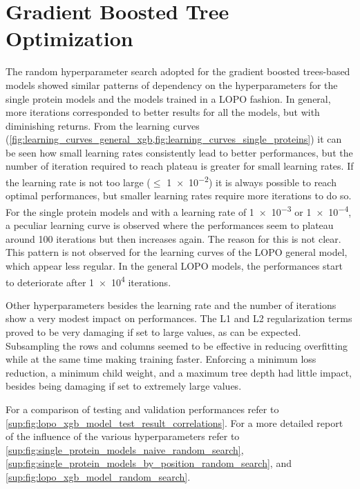 \section{Gradient Boosted Tree Optimization}
The random hyperparameter search adopted for the gradient boosted trees-based models showed similar patterns of dependency on the hyperparameters for the single protein models and the models trained in a LOPO fashion.
In general, more iterations corresponded to better results for all the models, but with diminishing returns.
From the learning curves (\cref{fig:learning_curves_general_xgb,fig:learning_curves_single_proteins}) it can be seen how small learning rates consistently lead to better performances, but the number of iteration required to reach plateau is greater for small learning rates.
If the learning rate is not too large ($\leq$ \num{1e-2}) it is always possible to reach optimal performances, but smaller learning rates require more iterations to do so.
For the single protein models and with a learning rate of \num{1e-3} or \num{1e-4}, a peculiar learning curve is observed where the performances seem to plateau around \num{100} iterations but then increases again.
The reason for this is not clear.
This pattern is not observed for the learning curves of the LOPO general model, which appear less regular.
In the general LOPO models, the performances start to deteriorate after \num{1e4} iterations.

Other hyperparameters besides the learning rate and the number of iterations show a very modest impact on performances.
The L1 and L2 regularization terms proved to be very damaging if set to large values, as can be expected.
Subsampling the rows and columns seemed to be effective in reducing overfitting while at the same time making training faster.
Enforcing a minimum loss reduction, a minimum child weight, and a maximum tree depth had little impact, besides being damaging if set to extremely large values.

For a comparison of testing and validation performances refer to \cref{sup:fig:lopo_xgb_model_test_result_correlations}.
For a more detailed report of the influence of the various hyperparameters refer to \cref{sup:fig:single_protein_models_naive_random_search}, \cref{sup:fig:single_protein_models_by_position_random_search}, and \cref{sup:fig:lopo_xgb_model_random_search}.

